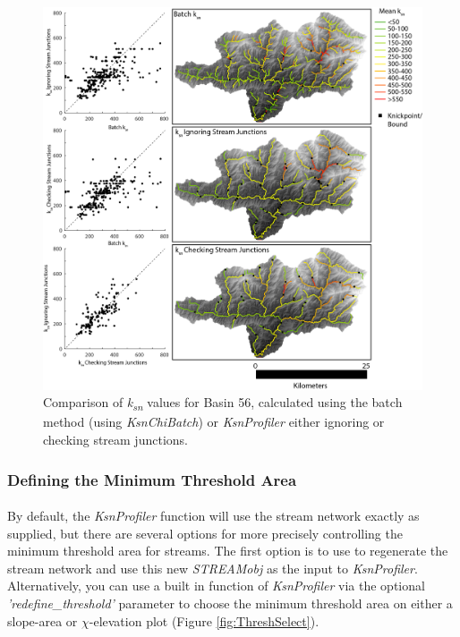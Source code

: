 \begin{figure}[H]
	\includegraphics[width=16.5cm]{PNGs/Basin56_ksn_comparison.png}
	\caption{Comparison of \textit{k\textsubscript{sn}} values for Basin 56, calculated using the batch method (using \textit{KsnChiBatch})  or \textit{KsnProfiler} either ignoring or checking stream junctions.}
	\label{fig:ProfilerComp}
\end{figure}

\subsubsection{Defining the Minimum Threshold Area}
\paragraph{}By default, the \textit{KsnProfiler} function will use the stream network exactly as supplied, but there are several options for more precisely controlling the minimum threshold area for streams. The first option is to use  to regenerate the stream network and use this new \textit{STREAMobj} as the input to \textit{KsnProfiler}. Alternatively, you can use a built in function of \textit{KsnProfiler} via the optional \textit{'redefine\_threshold'} parameter to choose the minimum threshold area on either a slope-area or $\chi$-elevation plot (Figure \ref{fig:ThreshSelect}).

